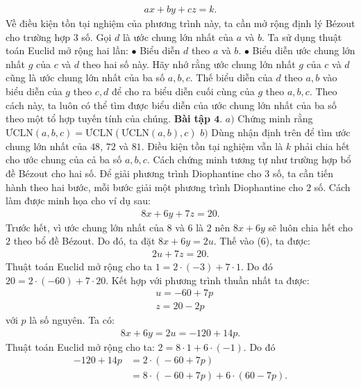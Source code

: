 \begin{multicols}{2}
	\begin{align*}
		ax+by+cz=k.
	\end{align*}
	Về điều kiện tồn tại nghiệm của phương trình này, ta cần mở rộng định lý Bézout cho trường hợp $3$ số.
	\vskip 0.1cm
	Gọi $d$ là ước chung lớn nhất của $a$ và $b$. Ta sử dụng thuật toán Euclid mở rộng hai lần: 
	\vskip 0.1cm
	$\bullet$ Biểu diễn $d$ theo $a$ và $b$.
	\vskip 0.1cm 
	$\bullet$ Biểu diễn ước chung lớn nhất $g$ của $c$ và $d$ theo hai số này. Hãy nhớ rằng ước chung lớn nhất $g$ của $c$ và $d$ cũng là ước chung lớn nhất của ba số $a,b,c$.
	\vskip 0.1cm
	Thế biểu diễn của $d$ theo $a,b$ vào biểu diễn của $g$ theo $c,d$ để cho ra biểu diễn cuối cùng của $g$ theo $a,b,c$.
	\vskip 0.1cm 
	Theo cách này, ta luôn có thể tìm được biểu diễn của ước chung lớn nhất của ba số theo một tổ hợp tuyến tính của chúng.
	\vskip 0.1cm
	\textbf{\color{hoccungpi}Bài tập $\pmb{4.}$}
	$a)$ Chứng minh rằng $\text{ƯCLN}(a,b,c) = \text{ƯCLN}(\text{ƯCLN}(a,b), c)$
	\vskip 0.1cm
	$b)$ Dùng nhận định trên để tìm ước chung lớn nhất của $48$, $72$ và $81$.
	\vskip 0.1cm
	Điều kiện tồn tại nghiệm vẫn là $k$ phải chia hết cho ước chung của cả ba số $a,b,c$. Cách chứng minh tương tự như trường hợp bổ đề Bézout cho hai số.
	\vskip 0.1cm
	Để giải phương trình Diophantine cho $3$ số, ta cần tiến hành theo hai bước, mỗi bước giải một phương trình Diophantine cho $2$ số. Cách làm được minh họa cho ví dụ sau:
	\begin{align*}
		8x+6y+7z=20. \tag{$6$}
	\end{align*}
	Trước hết, vì ước chung lớn nhất của $8$ và $6$ là $2$ nên $8x+6y$ sẽ luôn chia hết cho $2$ theo bổ đề Bézout. Do đó, ta đặt $8x+6y=2u$. Thế vào ($6$), ta được:
	\begin{align*}
		2u+7z=20.
	\end{align*}
	Thuật toán Euclid mở rộng cho ta $1=2\cdot (-3)+7\cdot 1$. Do đó $20=2\cdot (-60)+7\cdot 20$. Kết hợp với phương trình thuần nhất ta được:
	\begin{align*}
		&u=-60+7p\\
		&z=20-2p
	\end{align*}
	với $p$ là số nguyên.
	\vskip 0.1cm
	Ta có:
	\begin{align*}
		8x+6y=2u=-120+14p.
	\end{align*}
	Thuật toán Euclid mở rộng cho ta: $2=8\cdot 1+6\cdot (-1)$. Do đó 
	\begin{align*}
		-120+14p&=2\!\cdot\! (\!-\!60\!+\!7p)\\
		&=8\!\cdot\! (\!-\!60\!+\!7p)\!+\!6\!\cdot\! (60\!-\!7p).

\end{align*}
\end{multicols}

